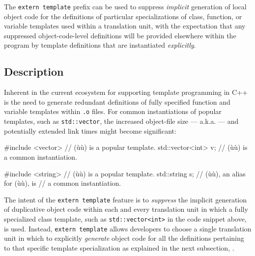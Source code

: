 

The \lstinline!extern!~\lstinline!template! prefix can be used to suppress
\emph{implicit} generation of local object code for the definitions of
particular specializations of class, function, or
variable templates used within a translation unit, with the
expectation that any suppressed object-code-level definitions will be
provided elsewhere within the program by template definitions that are
instantiated \emph{explicitly}.

\subsection[Description]{Description}\label{description}

Inherent in the current ecosystem for supporting template programming in
C++ is the need to generate redundant definitions of fully specified
function and variable templates within \lstinline!.o! files. For common
instantiations of popular templates, such as \lstinline!std::vector!, the
increased object-file size --- a.k.a.  --- and
potentially extended link times might become significant:

\begin{emcppslisting}
#include <vector>    // (ù{}ù) is a popular template.
std::vector<int> v;  // (ù{}ù) is a common instantiation.

#include <string>    // (ù{}ù) is a popular template.
std::string s;       // (ù{}ù), an alias for (ù{}ù), is
                     // a common instantiation.
\end{emcppslisting}

\noindent The intent of the \lstinline!extern!~\lstinline!template! feature is to
\emph{suppress} the implicit generation of duplicative object code
within each and every translation unit in which a fully specialized
class template, such as \lstinline!std::vector<int>! in the code snippet
above, is used. Instead, \lstinline!extern!~\lstinline!template! allows
developers to choose a single translation unit in which to explicitly
\emph{generate} object code for all the definitions pertaining to that
specific template specialization as explained in the next
subsection, .


